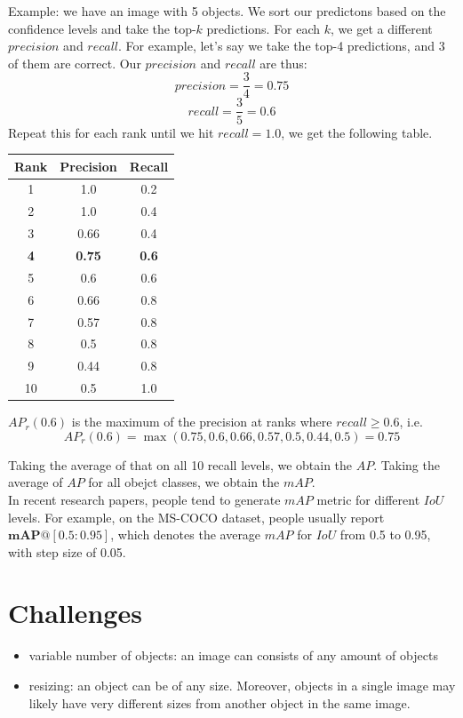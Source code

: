 \documentclass[12pt]{article}
\begin{document}
	Example: we have an image with 5 objects. We sort our predictons based on the confidence levels and take the top-$k$ predictions. For each $k$, we get a different $precision$ and $recall$. For example, let's say we take the top-4 predictions, and 3 of them are correct. Our $precision$ and $recall$ are thus:
	\[precision = \frac{3}{4}=0.75\]
	\[recall = \frac{3}{5} = 0.6\]
	Repeat this for each rank until we hit $recall=1.0$, we get the following table.
	\begin{center}
			\begin{tabular}{|c|c|c|}
			\hline
			Rank & Precision & Recall\\\hline
			1 & 1.0 & 0.2\\            \hline
			2 & 1.0 & 0.4\\            \hline
			3 & 0.66 & 0.4\\           \hline
			\textbf{4} & \textbf{0.75} & \textbf{0.6}\\           \hline
			5 & 0.6 & 0.6\\            \hline
			6 & 0.66 & 0.8\\           \hline
			7 & 0.57 & 0.8\\           \hline
			8 & 0.5 & 0.8\\            \hline
			9 & 0.44 & 0.8\\           \hline
			10 & 0.5 & 1.0\\          
			\hline
		\end{tabular} 
	\end{center}

	$AP_r(0.6)$ is the maximum of the precision at ranks where $recall \ge 0.6$, i.e.
	\[AP_r(0.6) = \max(0.75, 0.6, 0.66, 0.57, 0.5, 0.44, 0.5)=0.75\]
	
	Taking the average of that on all 10 recall levels, we obtain the $AP$. Taking the average of $AP$ for all obejct classes, we obtain the $mAP$.\\
	
	In recent research papers, people tend to generate $mAP$ metric for different $IoU$ levels. For example, on the MS-COCO dataset, people usually report $\mathbf{mAP@[0.5:0.95]}$, which denotes the average $mAP$ for $IoU$ from 0.5 to 0.95, with step size of 0.05.
	
	
	\section*{Challenges}
	\begin{itemize}
		\item variable number of objects: an image can consists of any amount of objects
		\item resizing: an object can be of any size. Moreover, objects in a single image may likely have very different sizes from another object in the same image.
	\end{itemize}
\end{document}
